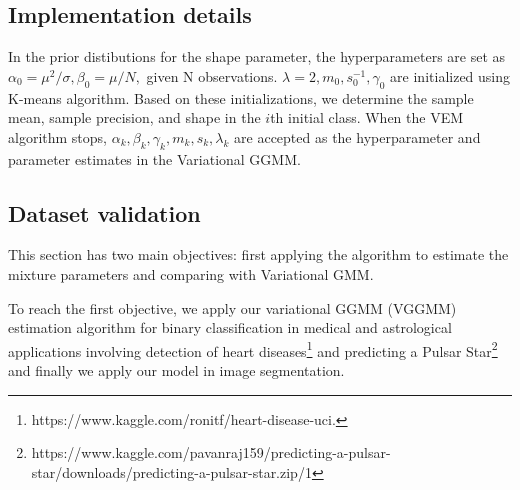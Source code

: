 \documentclass[conference]{IEEEtran}
\begin{document}
\subsection{Implementation details}
In the prior distibutions for the shape parameter, the hyperparameters are set as $\alpha_0 = \mu^2/\sigma, \beta_0 = \mu/N, $ given N observations. $\lambda=2, m_0, s_0^{-1}, \gamma_0$ are initialized using K-means algorithm.
Based on these initializations, we determine the sample mean, sample precision, and shape in the $i$th initial class.
When the VEM algorithm stops, $\alpha_k, \beta_k, \gamma_k, m_k, s_k, \lambda_k$ are accepted as the hyperparameter and parameter estimates in the Variational GGMM.
\subsection{Dataset validation}
This section has two main objectives: first applying the algorithm to estimate the mixture parameters and comparing with Variational GMM.

To reach the first objective, we apply our variational GGMM (VGGMM) estimation algorithm for binary classification in medical and astrological applications involving
detection of heart diseases\footnote{https://www.kaggle.com/ronitf/heart-disease-uci.} and predicting a Pulsar Star\footnote{https://www.kaggle.com/pavanraj159/predicting-a-pulsar-star/downloads/predicting-a-pulsar-star.zip/1} and finally we apply our model in image segmentation.
\end{document}
